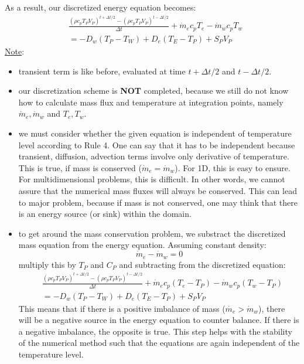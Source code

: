 \documentclass[11pt]{article}
\begin{document}
As a result, our discretized energy equation becomes:
\begin{equation}
\begin{aligned}
&\frac{(\rho c_p T_P V_P)^{t+\Delta t /2 } - (\rho c_p T_P V_P)^{t-\Delta t /2}}{\Delta t}  + \dot{m}_e c_p T_e - \dot{m}_w c_p T_w\\
&= -D_w (T_P-T_W) + D_e(T_E-T_P) + S_P V_P
\end{aligned}
\end{equation}
\uline{Note}:
\begin{itemize}
\item transient term is like before, evaluated at time \(t + \Delta t/2\) and \(t - \Delta t/2\).
\item our discretization scheme is \textbf{NOT} completed, because we still do not know how to calculate mass flux and temperature
at integration points, namely \(\dot{m}_e, \dot{m}_w\) and \(T_e, T_w\).
\item we must consider whether the given equation is independent of temperature level according to Rule 4. One can say that it has to
be independent because transient, diffusion, advection terms involve only derivative of temperature. This is true, if mass is conserved
(\(\dot{m}_e = \dot{m}_w\)).  For 1D, this is easy to ensure. For multidimensional problems, this is difficult. In other words, we cannot
assure that the numerical mass fluxes will always be conserved. This can lead to major problem, because if mass is not conserved, one
may think that there is an energy source (or sink) within the domain.
\item to get around the mass conservation problem, we substract the discretized mass equation from the energy equation. Assuming constant density:
\begin{equation*}
\dot{m}_e - \dot{m}_w = 0
\end{equation*}
multiply this by \(T_P\) and \(C_P\) and subtracting from the discretized equation:
\begin{equation}
\begin{aligned}
&\frac{(\rho c_p T_P V_P)^{t+\Delta t /2 } - (\rho c_p T_P V_P)^{t-\Delta t /2}}{\Delta t} + \dot{m}_e c_p (T_e-T_P) - \dot{m}_w c_p (T_w-T_P)\\
&= -D_w (T_P-T_W) + D_e(T_E-T_P) + S_P V_P
\end{aligned}
\end{equation}
This means that if there is a positive imbalance of mass (\(\dot{m_e} > \dot{m}_w\)), there will be a negative source in the energy equation
to counter balance. If there is a negative imbalance, the opposite is true. This step helps with the stability of the numerical method such that
the equations are again independent of the temperature level.
\end{itemize}
\end{document}
